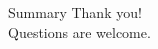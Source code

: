 \documentclass{beamer}
\begin{document}
\begin{frame}{Summary}
\center
\Huge{
Thank you! \\
Questions are welcome.
}
\end{frame}

%
%    
%    
%
% 
%    
%
\end{document}

